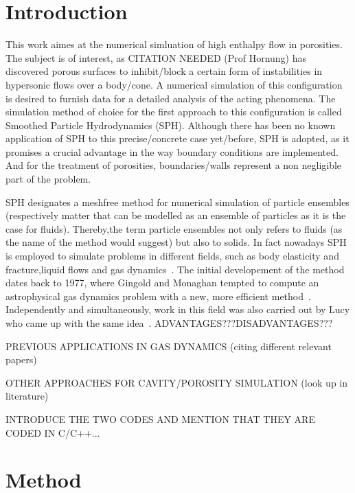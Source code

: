 \documentclass{report}
\begin{document}


\tableofcontents
\chapter{Introduction}
\label{sec:intro}


This work aimes at the numerical simluation of high enthalpy flow in
porosities. The subject is of interest, as CITATION
NEEDED (Prof Hornung) has discovered porous surfaces to inhibit/block a
certain form of instabilities in hypersonic flows over a body/cone. A numerical
simulation of this configuration is desired to furnish data for a detailed
analysis of the acting phenomena. The simulation method of choice for the first approach
to this configuration is called Smoothed Particle Hydrodynamics (SPH). Although
there has been no known application of SPH to this precise/concrete case yet/before,
SPH is adopted, as it promises a crucial advantage in the way boundary
conditions are implemented. And for the treatment of porosities,
boundaries/walls represent a non negligible part of the problem.

SPH designates a meshfree method for numerical simulation of particle
ensembles (respectively matter that can be modelled as an ensemble of
particles as it is the case for fluids).
Thereby,the term particle ensembles not only refers
to fluids (as the name of the method would suggest) but also to solids. In
fact nowadays SPH is employed to simulate problems in different fields,
such as body elasticity and fracture,liquid flows and gas
dynamics~\cite{Monaghan2005}.
The initial developement of the method dates back to 1977, where Gingold and
Monaghan tempted to compute an astrophysical gas dynamics problem with a new, more
efficient method~\cite{Gingold1977}. Independently and simultaneously, work in
this field was also carried out by Lucy who came up with the same
idea~\cite{Lucy1977}.
ADVANTAGES???DISADVANTAGES???

PREVIOUS APPLICATIONS IN GAS DYNAMICS (citing different relevant papers)

OTHER APPROACHES FOR CAVITY/POROSITY SIMULATION (look up in literature)

INTRODUCE THE TWO CODES AND MENTION THAT THEY ARE CODED IN C/C++...



\chapter{Method}
\label{sec:method}
\end{document}
